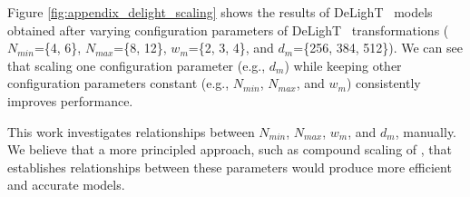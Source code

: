 \begin{table}[t!]
    \centering
    \caption{\textbf{Effect of the position of DeLighT transformation }. Lower value of perplexity means better performance.}
    \label{tab:dextra_position}
\end{table}

\vspace{1mm}
 Figure \ref{fig:appendix_delight_scaling} shows the results of DeLighT ~models obtained after varying configuration parameters of DeLighT ~transformations ($N_{min}$=\{4, 6\}, $N_{max}$=\{8, 12\}, $w_m$=\{2, 3, 4\}, and $d_m$=\{256, 384, 512\}). We can see that scaling one configuration parameter (e.g., $d_m$) while keeping other configuration parameters constant (e.g., $N_{min}$, $N_{max}$, and $w_m$) consistently improves performance.

This work investigates relationships between $N_{min}$, $N_{max}$, $w_m$, and $d_m$, manually. We believe that a more principled approach, such as compound scaling of \citet{tan2019efficientnet}, that establishes relationships between these parameters would produce more efficient and accurate models. %

